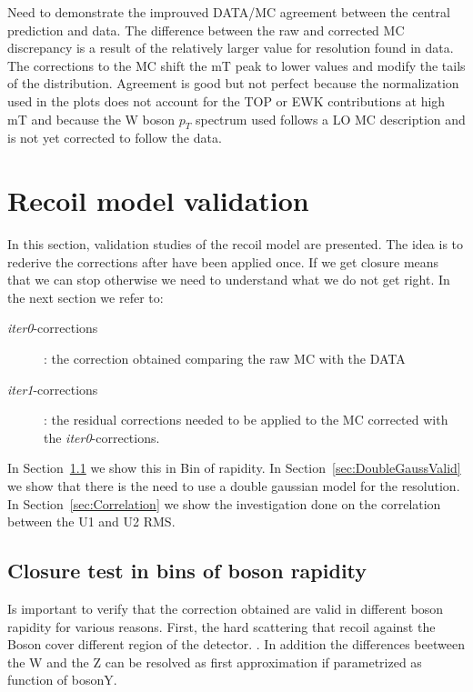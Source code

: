 \documentclass[41pt,a4paper,oneside]{report}
\begin{document}
Need to demonstrate the improuved DATA/MC agreement between the central prediction and data.
The difference between the raw and corrected MC discrepancy is a result of the relatively larger value for resolution
found in data.
The corrections to the MC shift the mT peak to lower values and modify the tails of the distribution. 
Agreement is good but not perfect because the normalization used in the plots does not account for the TOP or EWK contributions at high mT 
and because the W boson $p_{T}$ spectrum used follows a LO MC description and is not yet corrected to follow the data.


\section{Recoil model validation}
\label{sec:RecoilValidation}
In this section, validation studies of the recoil model are presented.
The idea is to rederive the corrections after have been applied once.
If we get closure means that we can stop otherwise we need to understand what we do
not get right.
In the next section we refer to:
\begin{description}
\item[{\it iter0}-corrections]: the correction obtained comparing the raw MC with the DATA 
\item[{\it iter1}-corrections]: the residual corrections needed to be applied to the MC corrected with the {\it iter0}-corrections.
\end{description}

In Section~\ref{sec:yBin} we show this in Bin of rapidity.
In Section~\ref{sec:DoubleGaussValid} we show that there is the need to use a double gaussian model for the resolution.
In Section~\ref{sec:Correlation} we show the investigation done on the correlation between the U1 and U2 RMS.


\subsection{Closure test in bins of boson rapidity}
\label{sec:yBin}

Is important to verify that the correction obtained are valid in different boson rapidity for various reasons.
First, the hard scattering that recoil against the Boson cover different region of the detector.
{\color{magenta}{Need to check that the plus and minus separated also since the detector is asymmetric}}.
In addition the differences beetween the W and the Z can be resolved as first approximation if parametrized as function of bosonY.
\end{document}
